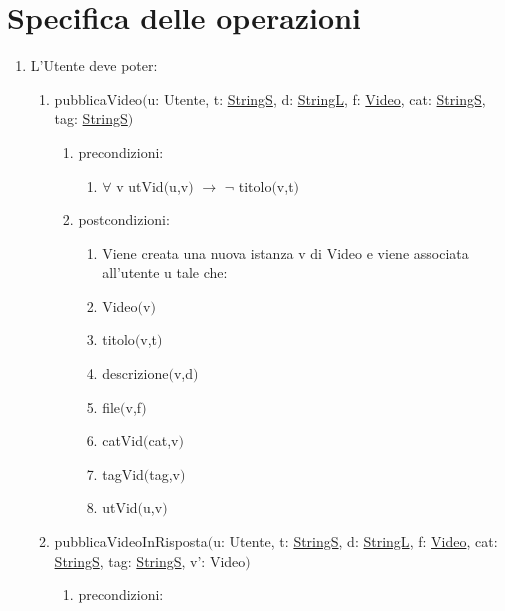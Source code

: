 \documentclass{article}
\begin{document}
\newpage

\section{\label{sec:Operazioni}Specifica delle operazioni}

\begin{enumerate}
    \item\label{sec:OperazioniUtente} L'Utente deve poter:
    \begin{enumerate}
        \item pubblicaVideo$($u: Utente, t: \hyperref[sec:TipoStringS]{StringS}, d: \hyperref[sec:TipoStringL]{StringL}, f: \hyperref[sec:TipoVideo]{Video}, cat: \hyperref[sec:TipoStringS]{StringS}, tag: \hyperref[sec:TipoStringS]{StringS}$)$
        \begin{enumerate}
            \item precondizioni:
            \begin{enumerate}
                \item $\forall$ v utVid$($u,v$)$ $\rightarrow$ $\neg$ titolo$($v,t$)$
            \end{enumerate}
            \item postcondizioni:
            \begin{enumerate}
                \item Viene creata una nuova istanza v di Video e viene associata all'utente u tale che:
                \item Video$($v$)$ 
                \item titolo$($v,t$)$
                \item descrizione$($v,d$)$
                \item file$($v,f$)$ 
                \item catVid$($cat,v$)$ 
                \item tagVid$($tag,v$)$
                \item utVid$($u,v$)$
            \end{enumerate}
        \end{enumerate}
        \item pubblicaVideoInRisposta$($u: Utente, t: \hyperref[sec:TipoStringS]{StringS}, d: \hyperref[sec:TipoStringL]{StringL}, f: \hyperref[sec:TipoVideo]{Video}, cat: \hyperref[sec:TipoStringS]{StringS}, tag: \hyperref[sec:TipoStringS]{StringS}, v': Video$)$
        \begin{enumerate}
            \item precondizioni:

\end{enumerate}
\end{enumerate}
\end{enumerate}
\end{document}
